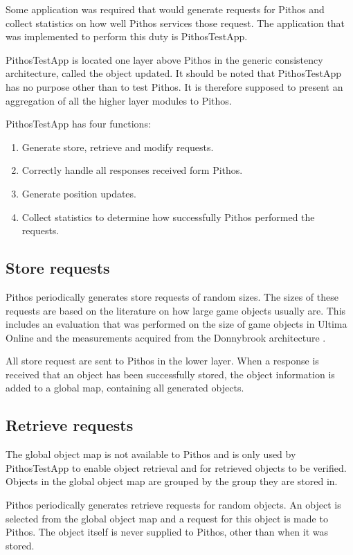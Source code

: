 Some application was required that would generate requests for Pithos and collect statistics on how well Pithos services those request. The application that was implemented to perform this duty is PithosTestApp.

PithosTestApp is located one layer above Pithos in the generic consistency architecture, called the object updated. It should be noted that PithosTestApp has no purpose other than to test Pithos. It is therefore supposed to present an aggregation of all the higher layer modules to Pithos.

PithosTestApp has four functions:
\begin{enumerate}
\item Generate store, retrieve and modify requests.
\item Correctly handle all responses received form Pithos.
\item Generate position updates.
\item Collect statistics to determine how successfully Pithos performed the requests.
\end{enumerate}

\subsection{Store requests}

Pithos periodically generates store requests of random sizes. The sizes of these requests are based on the literature on how large game objects usually are. This includes an evaluation that was performed on the size of game objects in Ultima Online and the measurements acquired from the Donnybrook architecture \cite{Bharambe_Donnybrook}.

All store request are sent to Pithos in the lower layer. When a response is received that an object has been successfully stored, the object information is added to a global map, containing all generated objects.

\subsection{Retrieve requests}

The global object map is not available to Pithos and is only used by PithosTestApp to enable object retrieval and for retrieved objects to be verified. Objects in the global object map are grouped by the group they are stored in.

Pithos periodically generates retrieve requests for random objects. An object is selected from the global object map and a request for this object is made to Pithos. The object itself is never supplied to Pithos, other than when it was stored.

